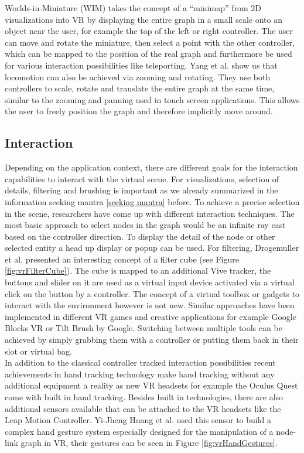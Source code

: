 Worlds-in-Miniature (WIM) \cite{drogemuller_examining_2020} takes the concept of a “minimap” from 2D visualizations into VR by displaying the entire graph in a small scale onto an object near the user, for example the top of the left or right controller. The user can move and rotate the miniature, then select a point with the other controller, which can be mapped to the position of the real graph and furthermore be used for various interaction possibilities like teleporting. Yang et al. \cite{yang_embodied_2020} show us that locomotion can also be achieved via zooming and rotating. They use both controllers to scale, rotate and translate the entire graph at the same time, similar to the zooming and panning used in touch screen applications. This allows the user to freely position the graph and therefore implicitly move around.

\subsection{Interaction}

Depending on the application context, there are different goals for the interaction capabilities to interact with the virtual scene. For visualizations, selection of details, filtering and brushing is important as we already summarized in the information seeking mantra \ref{seeking mantra} before. To achieve a precise selection in the scene, researchers have come up with different interaction techniques. The most basic approach to select nodes in the graph would be an infinite ray cast based on the controller direction. To display the detail of the node or other selected entity a head up display or popup can be used. 
For filtering, Drogemuller et al. \cite{drogemuller_vrige_2017} presented an interesting concept of a filter cube (see Figure \ref{fig:vrFilterCube}). The cube is mapped to an additional Vive tracker, the buttons and slider on it are used as a virtual input device activated via a virtual click on the button by a controller. 
The concept of a virtual toolbox or gadgets to interact with the environment however is not new. Similar approaches have been implemented in different VR games and creative applications for example Google Blocks VR or Tilt Brush by Google. Switching between multiple tools can be achieved by simply grabbing them with a controller or putting them back in their slot or virtual bag.\\
In addition to the classical controller tracked interaction possibilities recent achievements in hand tracking technology make hand tracking without any additional equipment a reality as new VR headsets for example the Oculus Quest come with built in hand tracking. Besides built in technologies, there are also additional sensors available that can be attached to the VR headsets like the Leap Motion Controller. Yi-Jheng Huang et al. \cite{yi-jheng_huang_gesture_2017} used this sensor to build a complex hand gesture system especially designed for the manipulation of a node-link graph in VR, their gestures can be seen in Figure \ref{fig:vrHandGestures}. 

